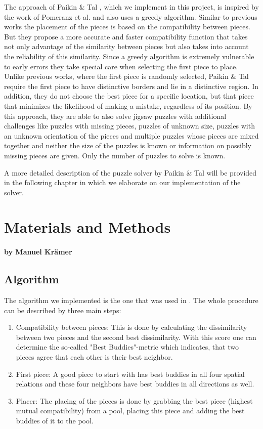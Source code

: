 \documentclass[11pt]{report}
\begin{document}
The approach of Paikin \& Tal \cite{Paikin2015}, which we implement in this
project, is inspired by the work of Pomeranz et al. \cite{Pomeranz2011} and also
uses a greedy algorithm. Similar to previous works the placement of the pieces
is based on the compatibility between pieces. But they propose a more accurate
and faster compatibility function that takes not only advantage of the
similarity between pieces but also takes into account the reliability of this
similarity. Since a greedy algorithm is extremely vulnerable to early errors
they take special care when selecting the first piece to place. Unlike previous
works, where the first piece is randomly selected, Paikin \& Tal require the first piece
to have distinctive borders and lie in a distinctive region. In addition, they
do not choose the best piece for a specific location, but that piece that
minimizes the likelihood of making a mistake, regardless of its position. By
this approach, they are able to also solve jigsaw puzzles with additional
challenges like puzzles with missing pieces, puzzles of unknown size, puzzles
with an unknown orientation of the pieces and multiple puzzles whose pieces are
mixed together and neither the size of the puzzles is known or information on
possibly missing pieces are given. Only the number of puzzles to solve is known.

A more detailed description of the puzzle solver by Paikin \& Tal will be
provided in the following chapter in which we elaborate on our implementation of
the solver.

\chapter{Materials and Methods}
\subsubsection*{by Manuel Krämer}
\section{Algorithm}
\label{sec:algo}
The algorithm we implemented is the one that was used in \cite{Paikin2015}. The whole procedure can be described by three main steps:
\begin{enumerate}
	\item Compatibility between pieces: This is done by calculating the dissimilarity between two pieces and the second best dissimilarity. With this score one can determine the so-called "Best Buddies"-metric which indicates, that two pieces agree that each other is their best neighbor.
	\item First piece: A good piece to start with has best buddies in all four spatial relations and these four neighbors have best buddies in all directions as well.
	\item Placer: The placing of the pieces is done by grabbing the best piece (highest mutual compatibility) from a pool, placing this piece and adding the best buddies of it to the pool.
\end{enumerate}
\end{document}
